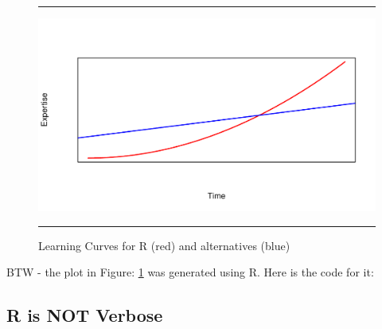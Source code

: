\documentclass[10pt, letterpaper, twoside]{memoir}\usepackage{knitr}
\begin{document}
\begin{figure}
\centering
\rule{4in}{1pt}
\begin{knitrout}
\color{fgcolor}
\includegraphics[width=\maxwidth]{figure/unnamed-chunk-8-1} 

\end{knitrout}
\caption{Learning Curves for R (red) and alternatives (blue)}
\label{fig:lcurve}
\rule{4in}{1pt}
\end{figure}

BTW - the plot in Figure: \ref{fig:lcurve} was generated using R. Here is the code for it:
\begin{knitrout}
\color{fgcolor}\begin{kframe}
\begin{alltt}
\hlopt{^}\hlstd{,}  \hlstd{=} \hlstd{,}  \hlstd{=} \hlstd{,}  \hlstd{=} \hlstd{,}  \hlstd{=} \hlstd{,}  \hlstd{=} \hlstd{,}
     \hlstd{=} \hlstd{,}  \hlstd{=} \hlstd{,}  \hlstd{=} \hlstd{)}
\hlstd{(} \hlstd{=} \hlstd{,}  \hlstd{=} \hlstd{,}  \hlstd{=} \hlstd{,}  \hlstd{=} \hlstd{)}
\end{alltt}
\end{kframe}
\end{knitrout}

\subsection{R is NOT Verbose}
\end{document}
